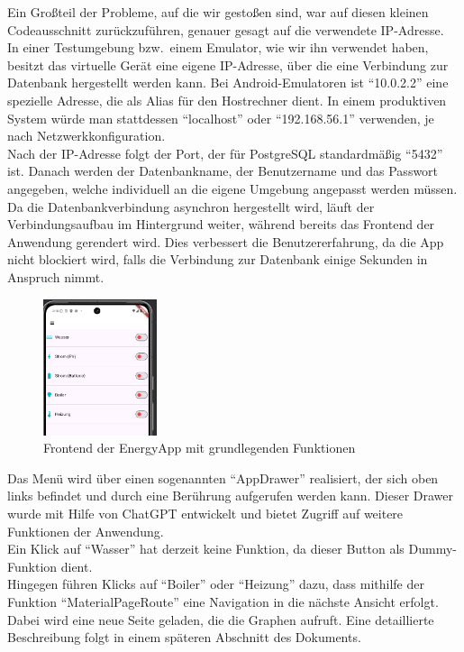 \documentclass{article}
\begin{document}
    Ein Großteil der Probleme, auf die wir gestoßen sind, war auf diesen kleinen Codeausschnitt zurückzuführen,
    genauer gesagt auf die verwendete IP-Adresse. \\
    In einer Testumgebung bzw.\ einem Emulator, wie wir ihn verwendet haben, besitzt das virtuelle Gerät eine eigene
    IP-Adresse, über die eine Verbindung zur Datenbank hergestellt werden kann.
    Bei Android-Emulatoren ist \enquote{10.0.2.2} eine spezielle Adresse, die als Alias für den Hostrechner dient.
    In einem produktiven System würde man stattdessen \enquote{localhost} oder \enquote{192.168.56.1} verwenden,
    je nach Netzwerkkonfiguration. \\
    Nach der IP-Adresse folgt der Port, der für PostgreSQL standardmäßig \enquote{5432} ist.
    Danach werden der Datenbankname, der Benutzername und das Passwort angegeben, welche individuell an die eigene
    Umgebung angepasst werden müssen. \\
    Da die Datenbankverbindung asynchron hergestellt wird, läuft der Verbindungsaufbau im Hintergrund weiter, während
    bereits das Frontend der Anwendung gerendert wird.
    Dies verbessert die Benutzererfahrung, da die App nicht blockiert wird, falls die Verbindung zur Datenbank einige
    Sekunden in Anspruch nimmt.
    \begin{figure}
        \centering
        \includegraphics[height=4cm]{images/FrontEndScreenshot}
        \caption{Frontend der EnergyApp mit grundlegenden Funktionen}
    \end{figure}
    Das Menü wird über einen sogenannten \enquote{AppDrawer} realisiert, der sich oben links befindet und
    durch eine Berührung aufgerufen werden kann.
    Dieser Drawer wurde mit Hilfe von ChatGPT entwickelt und bietet Zugriff auf weitere Funktionen der Anwendung. \\
    Ein Klick auf \enquote{Wasser} hat derzeit keine Funktion, da dieser Button als Dummy-Funktion dient. \\
    Hingegen führen Klicks auf \enquote{Boiler} oder \enquote{Heizung} dazu, dass mithilfe der Funktion
    \enquote{MaterialPageRoute} eine Navigation in die nächste Ansicht erfolgt.
    Dabei wird eine neue Seite geladen, die die Graphen aufruft.
    Eine detaillierte Beschreibung folgt in einem späteren Abschnitt des Dokuments.
\end{document}
